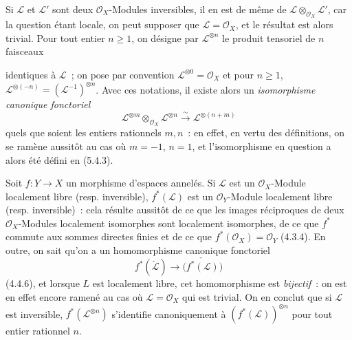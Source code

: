 \begin{env}[5.4.4]
\label{0.5.4.4-fr}
Si $\mathcal{L}$ et $\mathcal{L}'$ sont deux $\mathcal{O}_X$-Modules
inversibles, il en est de même de
$\mathcal{L}\otimes_{\mathcal{O}_X}\mathcal{L}'$, car la question étant
locale, on peut supposer que $\mathcal{L}=\mathcal{O}_X$, et le résultat est
alors trivial. Pour tout entier $n\geq1$, on désigne par
$\mathcal{L}^{\otimes n}$ le produit tensoriel de $n$ faisceaux


identiques à $\mathcal{L}$~; on pose par convention
$\mathcal{L}^{\otimes0}=\mathcal{O}_X$ et pour $n\geq1$,
$\mathcal{L}^{\otimes(-n)}=(\mathcal{L}^{-1})^{\otimes n}$. Avec ces
notations, il existe alors un \emph{isomorphisme canonique fonctoriel}
\[
  \mathcal{L}^{\otimes m}\otimes_{\mathcal{O}_X}\mathcal{L}^{\otimes n}
  \xrightarrow{\sim}
  \mathcal{L}^{\otimes(n+m)}
  \tag{5.4.4.1}\label{0.5.4.4.1-fr}
\]
quels que soient les entiers rationnels $m,n$~: en effet, en vertu des
définitions, on se ramène aussitôt au cas où $m=-1$, $n=1$, et
l'isomorphisme en question a alors été défini en (5.4.3).
\end{env}

\begin{env}[5.4.5]
\label{0.5.4.5-fr}
Soit $f:Y\to X$ un morphisme d'espaces annelés. Si $\mathcal{L}$ est un
$\mathcal{O}_X$-Module localement libre (resp. inversible),
$f^*(\mathcal{L})$ est un $\mathcal{O}_Y$-Module localement libre (resp.
inversible)~: cela résulte aussitôt de ce que les images réciproques de deux
$\mathcal{O}_X$-Modules localement isomorphes sont localement isomorphes, de
ce que $f^*$ commute aux sommes directes finies et de ce que
$f^*(\mathcal{O}_X)=\mathcal{O}_Y$ (4.3.4). En outre, on sait qu'on a un
homomorphisme canonique fonctoriel
\[
  f^*(\check{\mathcal{L}})
  \longrightarrow
  \check{\bigl(f^*(\mathcal{L})\bigr)}
\]
(4.4.6), et lorsque $L$ est localement libre, cet homomorphisme est
\emph{bijectif}~: on est en effet encore ramené au cas où
$\mathcal{L}=\mathcal{O}_X$ qui est trivial. On en conclut que si
$\mathcal{L}$ est inversible, $f^*(\mathcal{L}^{\otimes n})$ s'identifie
canoniquement à $(f^*(\mathcal{L}))^{\otimes n}$ pour tout entier rationnel
$n$.
\end{env}

